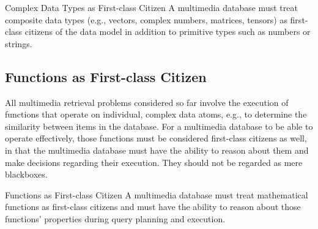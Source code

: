 \begin{requirement}[label=requirement:complex_data_types]{Complex Data Types as First-class Citizen}{}
    A multimedia database must treat composite data types (e.g., vectors, complex numbers, matrices, tensors) as first-class citizens of the data model in addition to primitive types such as numbers or strings.
\end{requirement}

\subsection{Functions as First-class Citizen}

All multimedia retrieval problems considered so far involve the execution of functions that operate on individual, complex data atoms, e.g., to determine the similarity between items in the database. For a multimedia database to be able to operate effectively, those functions must be considered first-class citizens as well, in that the multimedia database must have the ability to reason about them and make decisions regarding their execution. They should not be regarded as mere blackboxes.

\begin{requirement}{Functions as First-class Citizen}{}
    A multimedia database must treat mathematical functions as first-class citizens and must have the ability to reason about those functions' properties during query planning and execution.
\end{requirement}